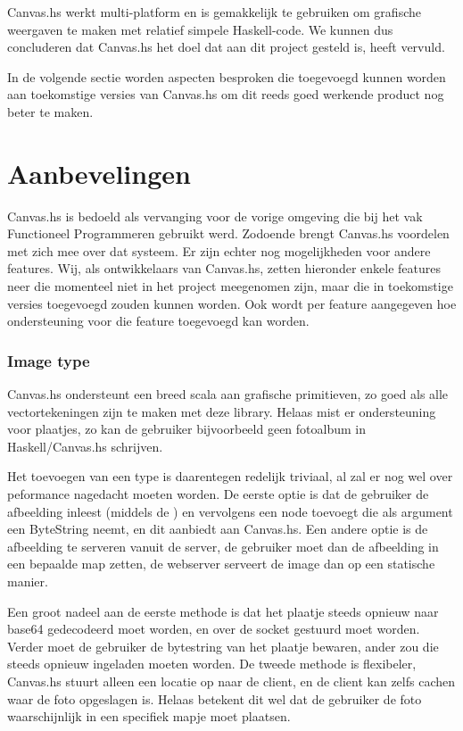 Canvas.hs werkt multi-platform en is gemakkelijk te gebruiken om grafische weergaven te maken met relatief simpele Haskell-code. We kunnen dus concluderen dat Canvas.hs het doel dat aan dit project gesteld is, heeft vervuld.

In de volgende sectie worden aspecten besproken die toegevoegd kunnen worden aan toekomstige versies van Canvas.hs om dit reeds goed werkende product nog beter te maken. 

\section{Aanbevelingen} \label{sec:aanbevelingen}
Canvas.hs is bedoeld als vervanging voor de vorige omgeving die bij het vak Functioneel Programmeren gebruikt werd. Zodoende brengt Canvas.hs voordelen met zich mee over dat systeem. Er zijn echter nog mogelijkheden voor andere features. Wij, als ontwikkelaars van Canvas.hs, zetten hieronder enkele features neer die momenteel niet in het project meegenomen zijn, maar die in toekomstige versies toegevoegd zouden kunnen worden. Ook wordt per feature aangegeven hoe ondersteuning voor die feature toegevoegd kan worden.

\subsubsection{Image type}
Canvas.hs ondersteunt een breed scala aan grafische primitieven, zo goed als alle vectortekeningen zijn te maken met deze library. Helaas mist er ondersteuning voor plaatjes, zo kan de gebruiker bijvoorbeeld geen fotoalbum in Haskell/Canvas.hs schrijven.

Het toevoegen van een  type is daarentegen redelijk triviaal, al zal er nog wel over peformance nagedacht moeten worden. De eerste optie is dat de gebruiker de afbeelding inleest (middels de ) en vervolgens een  node toevoegt die als argument een ByteString neemt, en dit aanbiedt aan Canvas.hs. Een andere optie is de afbeelding te serveren vanuit de server, de gebruiker moet dan de afbeelding in een bepaalde map zetten, de webserver serveert de image dan op een statische manier.

Een groot nadeel aan de eerste methode is dat het plaatje steeds opnieuw naar base64 gedecodeerd moet worden, en over de socket gestuurd moet worden. Verder moet de gebruiker de bytestring van het plaatje bewaren, ander zou die steeds opnieuw ingeladen moeten worden. De tweede methode is flexibeler, Canvas.hs stuurt alleen een locatie op naar de client, en de client kan zelfs cachen waar de foto opgeslagen is. Helaas betekent dit wel dat de gebruiker de foto waarschijnlijk in een specifiek mapje moet plaatsen.

